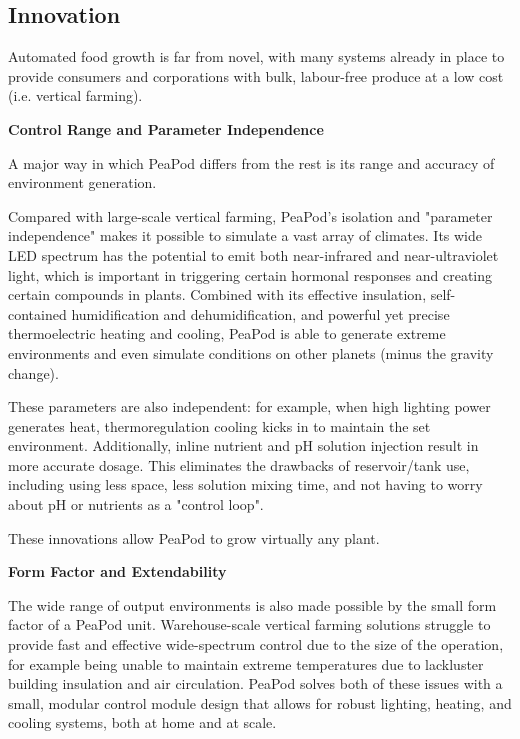 \documentclass{report}
\begin{document}
\subsection{Innovation}
\label{sec:innovation}



Automated food growth is far from novel, with many systems already in place to provide consumers and corporations with bulk, labour-free produce at a low cost (i.e. vertical farming). 

\textbf{Control Range and Parameter Independence}

A major way in which PeaPod differs from the rest is its range and accuracy of environment generation.

Compared with large-scale vertical farming, PeaPod’s isolation and "parameter independence" makes it possible to simulate a vast array of climates. Its wide LED spectrum has the potential to emit both near-infrared and near-ultraviolet light, which is important in triggering certain hormonal responses and creating certain compounds in plants. Combined with its effective insulation, self-contained humidification and dehumidification, and powerful yet precise thermoelectric heating and cooling, PeaPod is able to generate extreme environments and even simulate conditions on other planets (minus the gravity change). 

These parameters are also independent: for example, when high lighting power generates heat, thermoregulation cooling kicks in to maintain the set environment. Additionally, inline nutrient and pH solution injection result in more accurate dosage. This eliminates the drawbacks of reservoir/tank use, including using less space, less solution mixing time, and not having to worry about pH or nutrients as a "control loop".

These innovations allow PeaPod to grow virtually any plant. 

\textbf{Form Factor and Extendability}

The wide range of output environments is also made possible by the small form factor of a PeaPod unit. Warehouse-scale vertical farming solutions struggle to provide fast and effective wide-spectrum control due to the size of the operation, for example being unable to maintain extreme temperatures due to lackluster building insulation and air circulation. PeaPod solves both of these issues with a small, modular control module design that allows for robust lighting, heating, and cooling systems, both at home and at scale.
\end{document}
